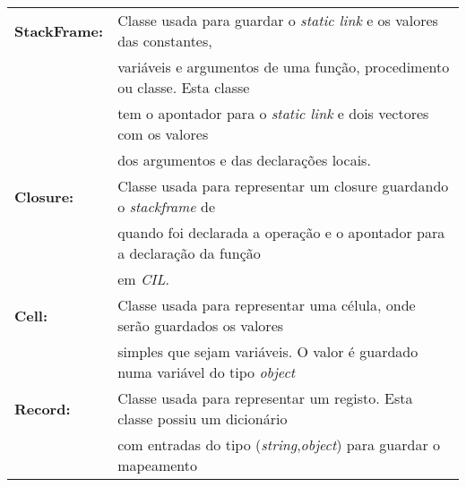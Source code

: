 {
\fontsize{9pt}{10}\selectfont
\begin{tabular}{ll}
\textbf{StackFrame:}	&Classe usada para guardar o \emph{static link} e os valores das constantes, \\
						&variáveis e argumentos de uma função, procedimento ou classe. Esta classe \\
					&tem o apontador para o \emph{static link} e dois vectores com os valores \\
					&dos argumentos e das declarações locais.\\
\hline
\textbf{Closure:}	&Classe usada para representar um closure guardando o \emph{stackframe} de \\
					&quando foi declarada a operação e o apontador para a declaração da função \\
					&em \emph{CIL}. \\
\hline
\textbf{Cell:}		&Classe usada para representar uma célula, onde serão guardados os valores \\ 
					&simples que sejam variáveis. O valor é guardado numa variável do tipo \emph{object}\\
\hline
\textbf{Record:}	&Classe usada para representar um registo. Esta classe possiu um dicionário \\
					&com entradas do tipo (\emph{string},\emph{object}) para guardar o mapeamento \\

\end{tabular}}
